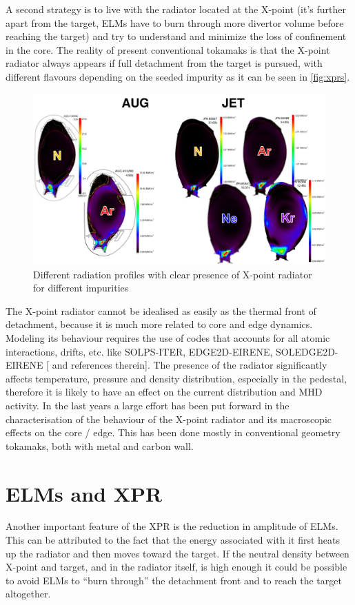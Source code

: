 A second strategy is to live with the radiator located at the X-point (it’s further apart from the target, ELMs have to burn through more divertor volume before reaching the target) and try to understand and minimize the loss of confinement in the core. The reality of present conventional tokamaks is that the X-point radiator always appears if full detachment from the target is pursued, with different flavours depending on the seeded impurity as it can be seen in \autoref{fig:xprs}.

\begin{figure}
	\centering
	\includegraphics[width=\linewidth]{Chapters/chapter1/figs/xprs.png}
	\caption{Different radiation profiles with clear presence of X-point radiator for different impurities
	\cite{Wiesen2017}}
	\label{fig:xprs}
\end{figure}

The X-point radiator cannot be idealised as easily as the thermal front of detachment, because it is much more related to core and edge dynamics. Modeling its behaviour requires the use of codes that accounts for all atomic interactions, drifts, etc. like SOLPS-ITER, EDGE2D-EIRENE, SOLEDGE2D-EIRENE [\cite{Wiesen2017a} and references therein]. The presence of the radiator significantly affects temperature, pressure and density distribution, especially in the pedestal, therefore it is likely to have an effect on the current distribution and MHD activity.
In the last years a large effort has been put forward in the characterisation of the behaviour of the X-point radiator and its macroscopic effects on the core / edge. This has been done mostly in conventional geometry tokamaks, both with metal and carbon wall.


\section{ELMs and XPR}
Another important feature of the XPR is the reduction in amplitude of ELMs. This can be attributed to the fact that the energy associated with it first heats up the radiator and then moves toward the target. If the neutral density between X-point and target, and in the radiator itself, is high enough it could be possible to avoid ELMs to “burn through” the detachment front and to reach the target altogether. \cite{Krasheninnikov2016}







